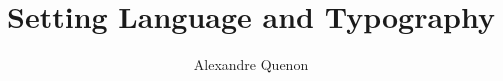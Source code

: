 \documentclass[11pt]{beamer}
\title{Setting Language and Typography}
\author[A. Quenon]{Alexandre Quenon}
\begin{document}


\begin{frame}
	\titlepage
\end{frame}


\begin{frame}
	\frametitle{}
	
	
\end{frame}



  

\end{document}
